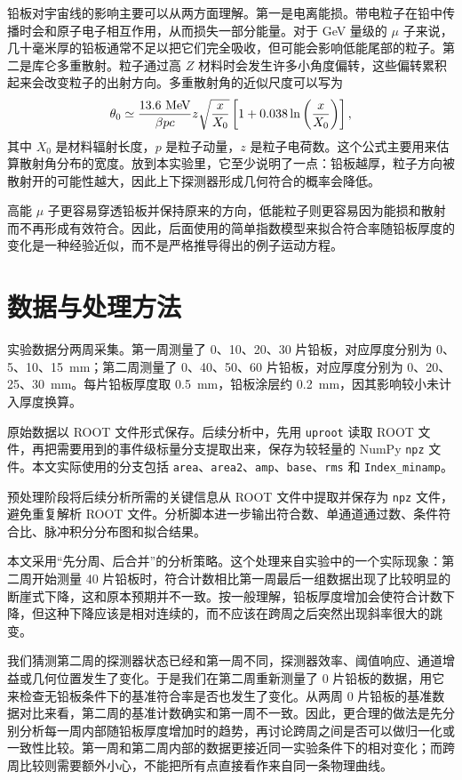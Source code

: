 \documentclass[aps,prl,twocolumn,superscriptaddress,nofootinbib]{revtex4-2}
\begin{document}
铅板对宇宙线的影响主要可以从两方面理解。第一是电离能损。带电粒子在铅中传播时会和原子电子相互作用，从而损失一部分能量。对于 GeV 量级的 $\mu$ 子来说，几十毫米厚的铅板通常不足以把它们完全吸收，但可能会影响低能尾部的粒子。第二是库仑多重散射。粒子通过高 $Z$ 材料时会发生许多小角度偏转，这些偏转累积起来会改变粒子的出射方向。多重散射角的近似尺度可以写为
\begin{equation}
\theta_0\simeq \frac{13.6\ {\rm MeV}}{\beta pc}z
\sqrt{\frac{x}{X_0}}
\left[1+0.038\ln\left(\frac{x}{X_0}\right)\right],
\end{equation}
其中 $X_0$ 是材料辐射长度，$p$ 是粒子动量，$z$ 是粒子电荷数。这个公式主要用来估算散射角分布的宽度。放到本实验里，它至少说明了一点：铅板越厚，粒子方向被散射开的可能性越大，因此上下探测器形成几何符合的概率会降低。

高能 $\mu$ 子更容易穿透铅板并保持原来的方向，低能粒子则更容易因为能损和散射而不再形成有效符合。因此，后面使用的简单指数模型来拟合符合率随铅板厚度的变化是一种经验近似，而不是严格推导得出的例子运动方程。


\section{数据与处理方法}

实验数据分两周采集。第一周测量了 0、10、20、30 片铅板，对应厚度分别为 0、5、10、\SI{15}{mm}；第二周测量了 0、40、50、60 片铅板，对应厚度分别为 0、20、25、\SI{30}{mm}。每片铅板厚度取 \SI{0.5}{mm}，铅板涂层约 \SI{0.2}{mm}，因其影响较小未计入厚度换算。

原始数据以 ROOT 文件形式保存。后续分析中，先用 \texttt{uproot} 读取 ROOT 文件，再把需要用到的事件级标量分支提取出来，保存为较轻量的 NumPy \texttt{npz} 文件。本文实际使用的分支包括 \texttt{area}、\texttt{area2}、\texttt{amp}、\texttt{base}、\texttt{rms} 和 \texttt{Index\_minamp}。

预处理阶段将后续分析所需的关键信息从 ROOT 文件中提取并保存为 \texttt{npz} 文件，避免重复解析 ROOT 文件。分析脚本进一步输出符合数、单通道通过数、条件符合比、脉冲积分分布图和拟合结果。

本文采用“先分周、后合并”的分析策略。这个处理来自实验中的一个实际现象：第二周开始测量 40 片铅板时，符合计数相比第一周最后一组数据出现了比较明显的断崖式下降，这和原本预期并不一致。按一般理解，铅板厚度增加会使符合计数下降，但这种下降应该是相对连续的，而不应该在跨周之后突然出现斜率很大的跳变。

我们猜测第二周的探测器状态已经和第一周不同，探测器效率、阈值响应、通道增益或几何位置发生了变化。于是我们在第二周重新测量了 0 片铅板的数据，用它来检查无铅板条件下的基准符合率是否也发生了变化。从两周 0 片铅板的基准数据对比来看，第二周的基准计数确实和第一周不一致。因此，更合理的做法是先分别分析每一周内部随铅板厚度增加时的趋势，再讨论跨周之间是否可以做归一化或一致性比较。第一周和第二周内部的数据更接近同一实验条件下的相对变化；而跨周比较则需要额外小心，不能把所有点直接看作来自同一条物理曲线。
\end{document}
